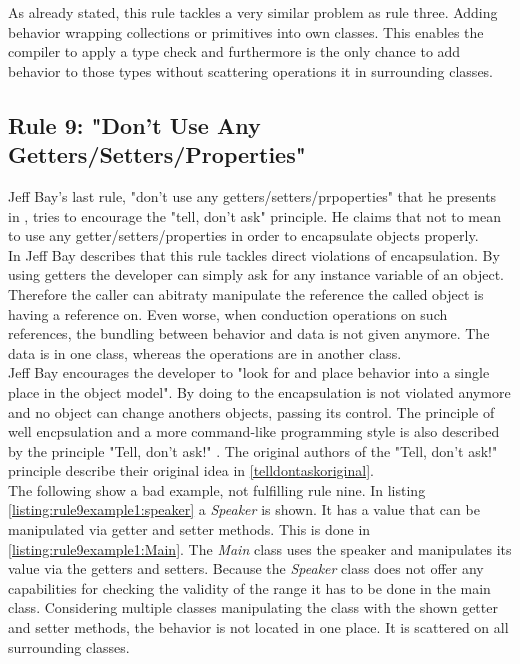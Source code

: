 As already stated, this rule tackles a very similar problem as rule three. Adding behavior wrapping collections or primitives into own classes. This enables the compiler to apply a type check and furthermore is the only chance to add behavior to those types without scattering operations it in surrounding classes. 

\subsection*{Rule 9: "Don’t Use Any Getters/Setters/Properties"}
Jeff Bay's last rule, "don't use any getters/setters/prpoperties" that he presents in \cite{oc2008}, tries to encourage the "tell, don't ask" principle. He claims that not to mean to use any getter/setters/properties in order to encapsulate objects properly.
\\

In \cite[p. 79]{oc2008} Jeff Bay describes that this rule tackles direct violations of encapsulation. By using getters the developer can simply ask for any instance variable of an object. Therefore the caller can abitraty manipulate the reference the called object is having a reference on. Even worse, when conduction operations on such references, the bundling between behavior and data is not given anymore. The data is in one class, whereas the operations are in another class. 
\\

Jeff Bay encourages the developer to "look for and place behavior into a single place in the object model". By doing to the encapsulation is not violated anymore and no object can change anothers objects, passing its control. The principle of well encpsulation and a more command-like programming style is also described by the principle "Tell, don't ask!" \cite{telldontask}. The original authors of the "Tell, don't ask!" principle describe their original idea in \ref{telldontaskoriginal}.
\\

The following show a bad example, not fulfilling rule nine. In listing \ref{listing:rule9example1:speaker} a \textit{Speaker} is shown. It has a value that can be manipulated via getter and setter methods. This is done in \ref{listing:rule9example1:Main}. The \textit{Main} class uses the speaker and manipulates its value via the getters and setters. Because the \textit{Speaker} class does not offer any capabilities for checking the validity of the range it has to be done in the main class. Considering multiple classes manipulating the class with the shown getter and setter methods, the behavior is not located in one place. It is scattered on all surrounding classes. 
\\

